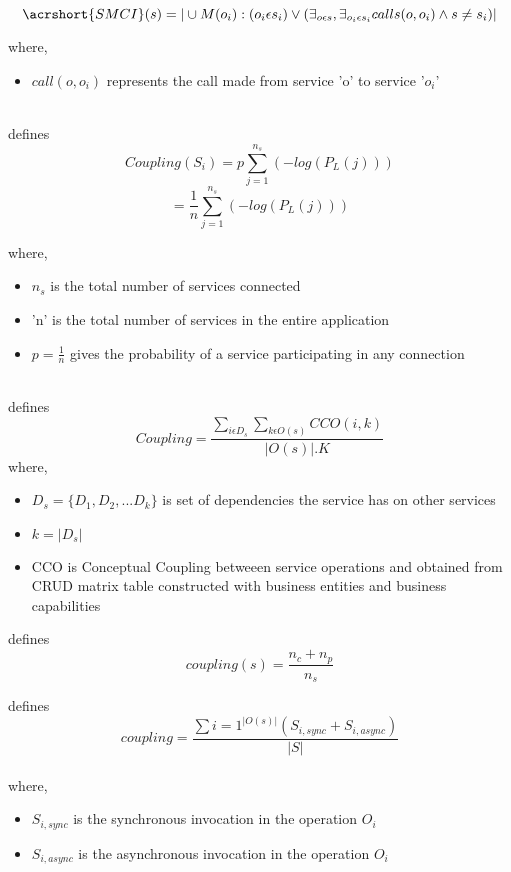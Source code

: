 {{$$ \acrshort{SMCI}(s) = | \cup M (o_{i}) : ( o_{i} \epsilon s_{i}) \vee ( \exists_{o \epsilon s}, \exists_{o_{i} \epsilon s_{i} } calls(o, o_{i}) \wedge s \neq s_{i} ) | $$

where, \\
\begin{itemize}[leftmargin=.5in]
\item $ call(o, o_i) $ represents the call made from service 'o' to service '$o_i$'
\end{itemize}
\\
\cite{Xiao-jun:2015aa} defines 
$$Coupling(S_i) =  p \sum_{j=1}^{n_s} (-log(P_L(j)))$$
$$= \frac{1}{n} \sum_{j=1}^{n_s} (-log(P_L(j)))$$

where, \\
\begin{itemize}[leftmargin=.5in]
\item $n_s$ is the total number of services connected
\item 'n' is the total number of services in the entire application
\item $p = \frac{1}{n}$ gives the probability of a service participating in any connection
\end{itemize}
\\
\cite{Kazemi:2011aa} defines
$$Coupling = \frac{\sum_{i \epsilon D_s} \sum_{k \epsilon O(s)}CCO(i,k)}{|O(s)|.K}$$
where, \\
\begin{itemize}[leftmargin=.5in]
\item $D_s = \{ D_1, D_2,...D_k \}$ is set of dependencies the service has on other services
\item $ k = |D_s| $
\item CCO is Conceptual Coupling betweeen service operations and obtained from CRUD matrix table constructed with business entities and business capabilities
\end{itemize}

\cite{Bingu-Shim:2008aa} defines
$$coupling(s) =  \frac{n_c + n_p}{n_s}$$

\cite{Saad-Alahmari:2011aa} defines
$$coupling = \frac{\sum{i=1}^{|O(s)|} (S_{i,sync} + S_{i,async})}{|S|}$$
\\
where,
\\
\begin{itemize}[leftmargin=.5in]
\item $S_{i,sync}$ is the synchronous invocation in the operation $O_i$
\item $S_{i,async}$ is the asynchronous invocation in the operation $O_i$
\end{itemize}


}}
